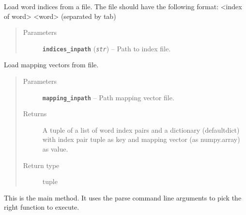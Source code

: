 \documentclass[letterpaper,10pt,english]{sphinxmanual}
\begin{document}
\begin{fulllineitems}
\label{src.clustering:src.clustering.cluster_mappings.load_indices}
Load word indices from a file. The file should have the following format: \textless{}index of word\textgreater{}       \textless{}word\textgreater{} (separated by
tab)
\begin{quote}\begin{description}
\item[{Parameters}] \leavevmode
\textbf{\texttt{indices\_inpath}} (\emph{\texttt{str}}) -- Path to index file.

\end{description}\end{quote}

\end{fulllineitems}


\begin{fulllineitems}
\label{src.clustering:src.clustering.cluster_mappings.load_mappings_from_model}
Load mapping vectors from file.
\begin{quote}\begin{description}
\item[{Parameters}] \leavevmode
\textbf{\texttt{mapping\_inpath}} -- Path mapping vector file.

\item[{Returns}] \leavevmode
A tuple of a list of word index pairs and a dictionary (defaultdict) with index pair tuple as key
and mapping vector (as numpy.array) as value.

\item[{Return type}] \leavevmode
tuple

\end{description}\end{quote}

\end{fulllineitems}


\begin{fulllineitems}
\label{src.clustering:src.clustering.cluster_mappings.main}
This is the main method. It uses the parse command line arguments to pick the right function to execute.

\end{fulllineitems}
\end{document}

